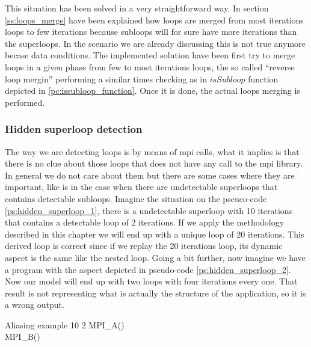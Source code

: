 This situation has been solved in a very straightforward way. In section
\ref{ss:loops_merge} have been explained how loops are merged from most
iterations loops to few iterations because subloops will for sure have more
iterations than the superloops. In the scenario we are already discussing this
is not true anymore becase data conditions. The implemented solution have been
first try to merge loops in a given phase from few to most iterations loops, the
so called ``reverse loop mergin'' performing a similar times checking as in 
$isSubloop$ function depicted in \ref{pc:issubloop_function}. Once it is done,
the actual loops merging is performed.

\subsubsection{Hidden superloop detection}\label{ss:hidden_superloop_det}

The way we are detecting loops is by means of mpi calls, what it implies is that
there is no clue about those loops that does not have any call to the mpi
library. In general we do not care about them but there are some cases where
they are important, like is in the case when there are undetectable superloops
that contains detectable subloops. Imagine the situation on the pseuco-code
\ref{ps:hidden_superloop_1}, there is a undetectable superloop with 10 iterations 
that contains a detectable loop of 2 iterations. If we apply the methodology
described in this chapter we will end up with a unique loop of 20 iterations.
This derived loop is correct since if we replay the 20 iterations loop, its
dynamic aspect is the same like the nested loop. Going a bit further, now
imagine we have a program with the aspect depicted in pseudo-code
\ref{ps:hidden_superloop_2}. Now our model will end up with two loops with four
iterations every one. That result is not representing what is actually the
structure of the application, so it is a wrong output.

\begin{pseudocode}{Aliasing example}{ }
    \label{ps:hidden_superloop_1}
      10 \DO
    \BEGIN
          2 \DO
        \BEGIN
            MPI\_A() \\
            MPI\_B() \\
        \END \\
    \END \\
\end{pseudocode}

